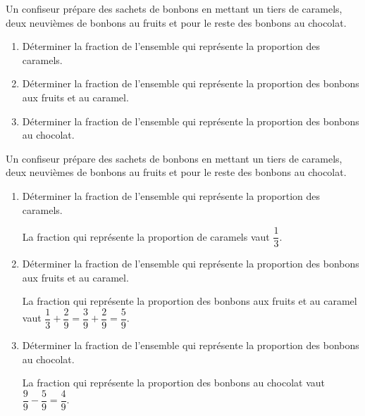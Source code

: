 \begin{exercice*}
    Un confiseur prépare des sachets de bonbons en mettant un tiers de caramels, deux neuvièmes de bonbons au fruits 
    et pour le reste des bonbons au chocolat.

    \begin{enumerate}
        \item Déterminer la fraction de l'ensemble qui représente la proportion des caramels.
        \item Déterminer la fraction de l'ensemble qui représente la proportion des bonbons aux fruits et au caramel.
        \item Déterminer la fraction de l'ensemble qui représente la proportion des bonbons au chocolat.
    \end{enumerate}
\end{exercice*}
\begin{corrige}
    Un confiseur prépare des sachets de bonbons en mettant un tiers de caramels, deux neuvièmes de bonbons au fruits 
    et pour le reste des bonbons au chocolat.

    \begin{enumerate}
        \item Déterminer la fraction de l'ensemble qui représente la proportion des caramels.
        
        {\red La fraction qui représente la proportion de caramels vaut $\dfrac{1}{3}$.}
        \item Déterminer la fraction de l'ensemble qui représente la proportion des bonbons aux fruits et au caramel.
        
        {\red La fraction qui représente la proportion des bonbons aux fruits et au caramel vaut $\dfrac{1}{3}+\dfrac{2}{9}=\dfrac{3}{9}+\dfrac{2}{9}=\dfrac{5}{9}$.}
        \item Déterminer la fraction de l'ensemble qui représente la proportion des bonbons au chocolat.
        
        {\red La fraction qui représente la proportion des bonbons au chocolat vaut $\dfrac{9}{9}-\dfrac{5}{9}=\dfrac{4}{9}$.}
    \end{enumerate}

\end{corrige}

